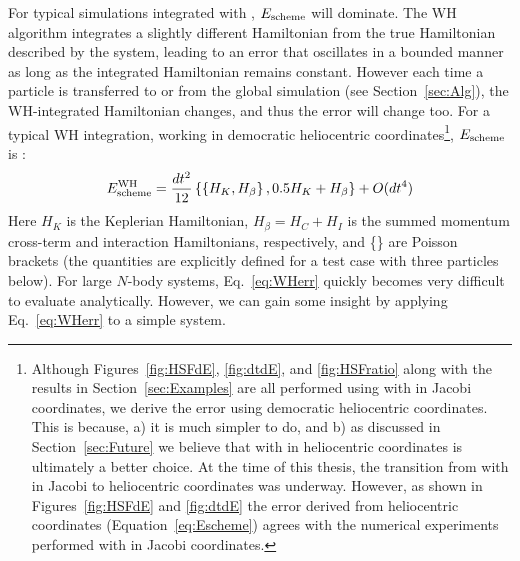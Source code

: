 For typical simulations integrated with \hermes, $E_{\rm scheme}$ will dominate. 
The WH algorithm integrates a slightly different Hamiltonian from the true Hamiltonian described by the system, leading to an error that oscillates in a bounded manner as long as the integrated Hamiltonian remains constant.
However each time a particle is transferred to or from the global simulation (see Section~\ref{sec:Alg}), the WH-integrated Hamiltonian changes, and thus the error will change too.
For a typical WH integration, working in democratic heliocentric coordinates\footnote{Although Figures~\ref{fig:HSFdE}, \ref{fig:dtdE}, and \ref{fig:HSFratio} along with the results in Section~\ref{sec:Examples} are all performed using \hermes with \whfast in Jacobi coordinates, we derive the error using democratic heliocentric coordinates. This is because, a) it is much simpler to do, and b) as discussed in Section~\ref{sec:Future} we believe that \hermes with \whfast in heliocentric coordinates is ultimately a better choice. At the time of this thesis, the transition from \hermes with \whfast in Jacobi to heliocentric coordinates was underway. However, as shown in Figures~\ref{fig:HSFdE} and \ref{fig:dtdE} the error derived from heliocentric coordinates (Equation~\ref{eq:Escheme}) agrees with the numerical experiments performed with \whfast in Jacobi coordinates.}, $E_{\rm scheme}$ is \citep[e.g.][]{Saha1994,Wisdom2006}:
\begin{equation}
E_{\rm scheme}^{\rm WH} = \frac{dt^2}{12} \left \{ \left \{H_K, H_{\beta} \right \},  0.5H_K + H_{\beta} \right \} + O(dt^4)
\label{eq:WHerr}
\end{equation}
Here $H_K$ is the Keplerian Hamiltonian, $H_{\beta} = H_C + H_I$ is the summed momentum cross-term and interaction Hamiltonians, respectively, and \{\} are Poisson brackets (the quantities are explicitly defined for a test case with three particles below). 
For large $N$-body systems, Eq.~\ref{eq:WHerr} quickly becomes very difficult to evaluate analytically. 
However, we can gain some insight by applying Eq.~\ref{eq:WHerr} to a simple system. 

